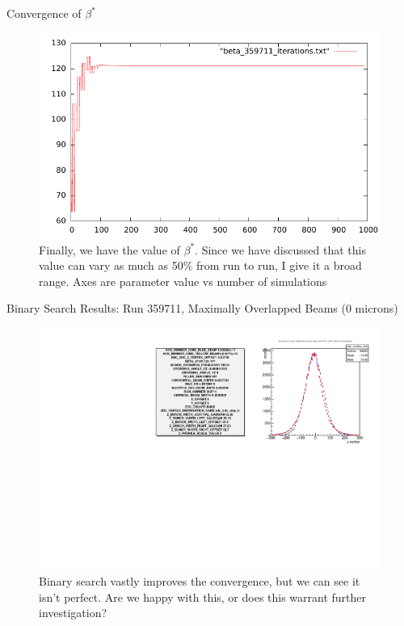 \begin{frame}{ Convergence of $\beta^{*}$ }
\begin{figure}
\begin{center}
\includegraphics[width=0.8\linewidth]{../RootFinding/figs/beta_359711_convergence.pdf}
\end{center}
\caption{Finally, we have the value of $\beta^{*}$. Since we have discussed that
this value can vary as much as 50\% from run to run, I give it a broad
range. Axes are parameter value vs number of simulations}
\label{fig:beta_359711_convergence}
\end{figure}
\end{frame}

\begin{frame}{ Binary Search Results: Run 359711, Maximally Overlapped Beams (0 microns)}
\begin{figure}
\begin{center}
\includegraphics[width=\linewidth]{../RootFinding/figs/359711_max_overlap_binary_search.pdf}
\end{center}
\caption{Binary search vastly improves the convergence, but we can see it isn't
perfect. Are we happy with this, or does this warrant further investigation?}
\label{fig:359711_max_overlap_binary_search}
\end{figure}
\end{frame}

